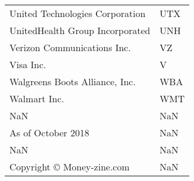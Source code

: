 \begin{tabular}{ll}
             United Technologies Corporation &           UTX \\
             UnitedHealth Group Incorporated &           UNH \\
                 Verizon Communications Inc. &            VZ \\
                                   Visa Inc. &             V \\
              Walgreens Boots Alliance, Inc. &           WBA \\
                                Walmart Inc. &           WMT \\
                                         NaN &           NaN \\
                          As of October 2018 &           NaN \\
                                         NaN &           NaN \\
                  Copyright © Money-zine.com &           NaN \\
\bottomrule
\end{tabular}
